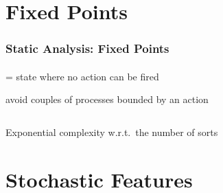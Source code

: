 
\section[Annex: Fixed Points]{Fixed Points}

\begin{frame}[c]
  \frametitle{Static Analysis: Fixed Points}
  \framesubtitle{\tcite{\cpmrtcsb}}

 = state where no action can be fired
\begin{fleches}
  \item avoid couples of processes bounded by an action
\end{fleches}

\bigskip
\begin{columns}
\begin{column}{0.5\textwidth}

\begin{center}
\scalebox{0.7}{
\begin{tikzpicture}
\exdefb
\exdefbfrappes
\end{tikzpicture}
}
\end{center}

\end{column}
\begin{column}{0.5\textwidth}


\end{column}
\end{columns}

\bigskip
\pause[6]
Exponential complexity w.r.t.~the number of sorts

\end{frame}



\section[Annex: Stochastic Features]{Stochastic Features}

